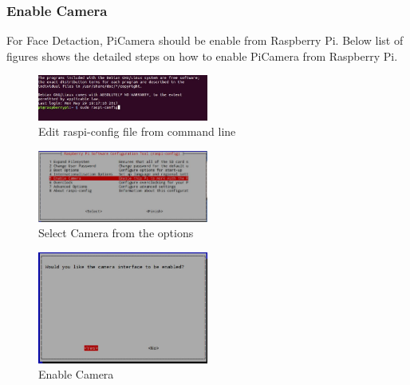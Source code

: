 \documentclass[sigconf]{acmart}
\begin{document}
\subsubsection{Enable Camera}
For Face Detaction, PiCamera should be enable from Raspberry Pi. Below list of figures shows the detailed steps on how to enable PiCamera from Raspberry Pi.

\begin{figure}[ht!]
  \includegraphics[width=0.5\textwidth]{project/images/enablecamera1.jpg}
  \caption{Edit raspi-config file from command line}
\end{figure}

\begin{figure}[ht!]
  \includegraphics[width=0.5\textwidth]{project/images/enablecamera2.jpg}
  \caption{Select Camera from the options}
\end{figure}

\begin{figure}[ht!]
  \includegraphics[width=0.5\textwidth]{project/images/enablecamera3.jpg}
  \caption{Enable Camera}
\end{figure}
\end{document}
